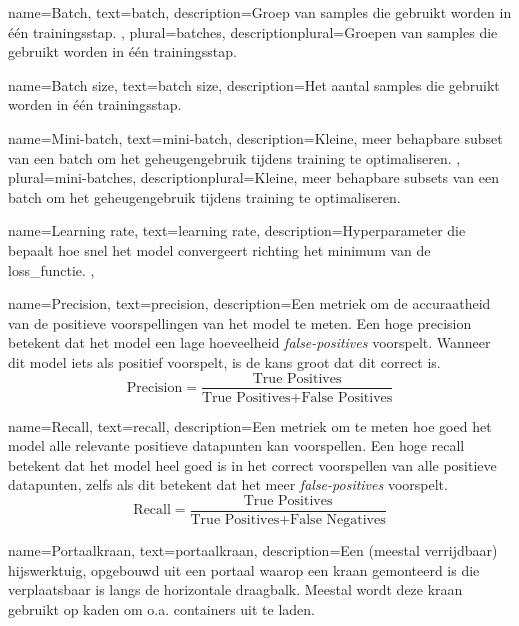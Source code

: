 {
    name={Batch},
    text={batch},
    description={Groep van samples die gebruikt worden in één trainingsstap. \autocite{Geron_2023}},
    plural={batches},
    descriptionplural={Groepen van samples die gebruikt worden in één trainingsstap. \autocite{Geron_2023}}    
}

{
    name={Batch size},
    text={batch size},
    description={Het aantal samples die gebruikt worden in één trainingsstap. \autocite{Geron_2023}}
}

{
    name={Mini-batch},
    text={mini-batch},
    description={Kleine, meer behapbare subset van een batch om het geheugengebruik tijdens training te optimaliseren. \autocite{Geron_2023}},
    plural={mini-batches},
    descriptionplural={Kleine, meer behapbare subsets van een batch om het geheugengebruik tijdens training te optimaliseren. \autocite{Geron_2023}}    
}

{
    name={Learning rate},
    text={learning rate},
    description={Hyperparameter die bepaalt hoe snel het model convergeert richting het minimum van de \gls{loss_functie}. \autocite{Geron_2023}},
}

{
    name={Precision},
    text={precision},
    description={Een metriek om de accuraatheid van de positieve voorspellingen van het model te meten. Een hoge precision betekent dat het model een lage hoeveelheid \emph{false-positives} voorspelt. Wanneer dit model iets als positief voorspelt, is de kans groot dat dit correct is. 
        $$
        \text{Precision} = \frac{\text{True Positives}}{\text{True Positives} + \text{False Positives}}
        $$
        \autocite{Geron_2023}}
}

{
    name={Recall},
    text={recall},
    description={Een metriek om te meten hoe goed het model alle relevante positieve datapunten kan voorspellen. Een hoge recall betekent dat het model heel goed is in het correct voorspellen van alle positieve datapunten, zelfs als dit betekent dat het meer \emph{false-positives} voorspelt.
        $$
        \text{Recall} = \frac{\text{True Positives}}{\text{True Positives} + \text{False Negatives}}
        $$
        \autocite{Geron_2023}}
}

{
    name={Portaalkraan},
    text={portaalkraan},
    description={Een (meestal verrijdbaar) hijswerktuig, opgebouwd uit een portaal waarop een kraan gemonteerd is die verplaatsbaar is langs de horizontale draagbalk. Meestal wordt deze kraan gebruikt op kaden om o.a. containers uit te laden.}
}


